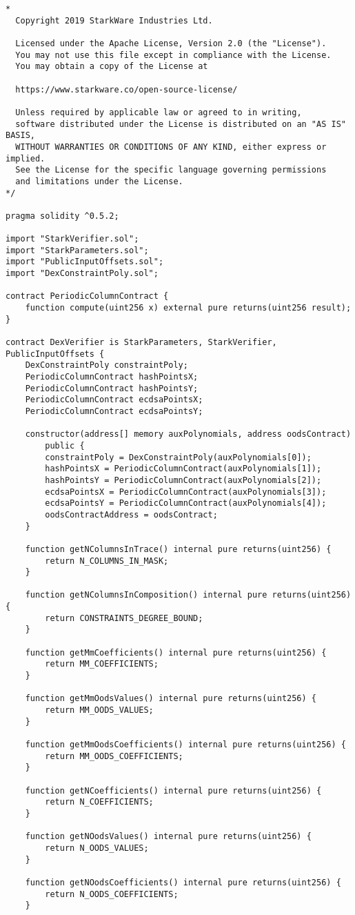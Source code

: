 \documentclass{article}
\begin{document}
\begin{lstlisting}
*
  Copyright 2019 StarkWare Industries Ltd.

  Licensed under the Apache License, Version 2.0 (the "License").
  You may not use this file except in compliance with the License.
  You may obtain a copy of the License at

  https://www.starkware.co/open-source-license/

  Unless required by applicable law or agreed to in writing,
  software distributed under the License is distributed on an "AS IS" BASIS,
  WITHOUT WARRANTIES OR CONDITIONS OF ANY KIND, either express or implied.
  See the License for the specific language governing permissions
  and limitations under the License.
*/

pragma solidity ^0.5.2;

import "StarkVerifier.sol";
import "StarkParameters.sol";
import "PublicInputOffsets.sol";
import "DexConstraintPoly.sol";

contract PeriodicColumnContract {
    function compute(uint256 x) external pure returns(uint256 result);
}

contract DexVerifier is StarkParameters, StarkVerifier, PublicInputOffsets {
    DexConstraintPoly constraintPoly;
    PeriodicColumnContract hashPointsX;
    PeriodicColumnContract hashPointsY;
    PeriodicColumnContract ecdsaPointsX;
    PeriodicColumnContract ecdsaPointsY;

    constructor(address[] memory auxPolynomials, address oodsContract)
        public {
        constraintPoly = DexConstraintPoly(auxPolynomials[0]);
        hashPointsX = PeriodicColumnContract(auxPolynomials[1]);
        hashPointsY = PeriodicColumnContract(auxPolynomials[2]);
        ecdsaPointsX = PeriodicColumnContract(auxPolynomials[3]);
        ecdsaPointsY = PeriodicColumnContract(auxPolynomials[4]);
        oodsContractAddress = oodsContract;
    }

    function getNColumnsInTrace() internal pure returns(uint256) {
        return N_COLUMNS_IN_MASK;
    }

    function getNColumnsInComposition() internal pure returns(uint256) {
        return CONSTRAINTS_DEGREE_BOUND;
    }

    function getMmCoefficients() internal pure returns(uint256) {
        return MM_COEFFICIENTS;
    }

    function getMmOodsValues() internal pure returns(uint256) {
        return MM_OODS_VALUES;
    }

    function getMmOodsCoefficients() internal pure returns(uint256) {
        return MM_OODS_COEFFICIENTS;
    }

    function getNCoefficients() internal pure returns(uint256) {
        return N_COEFFICIENTS;
    }

    function getNOodsValues() internal pure returns(uint256) {
        return N_OODS_VALUES;
    }

    function getNOodsCoefficients() internal pure returns(uint256) {
        return N_OODS_COEFFICIENTS;
    }
\end{lstlisting}
\end{document}
